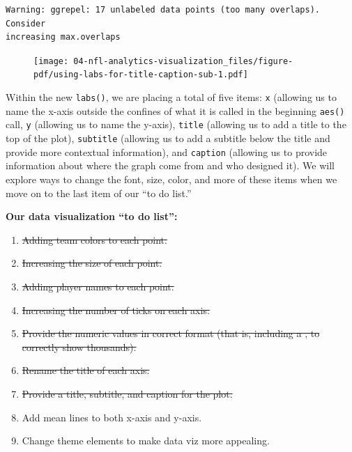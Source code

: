 \documentclass[
  letterpaper,
]{krantz}
\begin{document}
\begin{verbatim}
Warning: ggrepel: 17 unlabeled data points (too many overlaps). Consider
increasing max.overlaps
\end{verbatim}

\begin{figure}[H]

{\centering \texttt{[image: 04-nfl-analytics-visualization\_files/figure-pdf/using-labs-for-title-caption-sub-1.pdf]}

}

\end{figure}

Within the new \texttt{labs()}, we are placing a total of five items:
\texttt{x} (allowing us to name the x-axis outside the confines of what
it is called in the beginning \texttt{aes()} call, \texttt{y} (allowing
us to name the y-axis), \texttt{title} (allowing us to add a title to
the top of the plot), \texttt{subtitle} (allowing us to add a subtitle
below the title and provide more contextual information), and
\texttt{caption} (allowing us to provide information about where the
graph come from and who designed it). We will explore ways to change the
font, size, color, and more of these items when we move on to the last
item of our ``to do list.''

\begin{tcolorbox}[enhanced jigsaw, left=2mm, toprule=.15mm, opacitybacktitle=0.6, leftrule=.75mm, bottomrule=.15mm, colbacktitle=quarto-callout-note-color!10!white, breakable, colback=white, bottomtitle=1mm, toptitle=1mm, title=\textcolor{quarto-callout-note-color}{\faInfo}\hspace{0.5em}{Note}, coltitle=black, titlerule=0mm, arc=.35mm, opacityback=0, colframe=quarto-callout-note-color-frame, rightrule=.15mm]

\textbf{Our data visualization ``to do list'':}

\begin{enumerate}
\def\labelenumi{\arabic{enumi}.}
\item
  \st{Adding team colors to each point.}
\item
  \st{Increasing the size of each point.}
\item
  \st{Adding player names to each point.}
\item
  \st{Increasing the number of ticks on each axis.}
\item
  \st{Provide the numeric values in correct format (that is, including a
  , to correctly show thousands).}
\item
  \st{Rename the title of each axis.}
\item
  \st{Provide a title, subtitle, and caption for the plot.}
\item
  Add mean lines to both x-axis and y-axis.
\item
  Change theme elements to make data viz more appealing.
\end{enumerate}

\end{tcolorbox}
\end{document}
